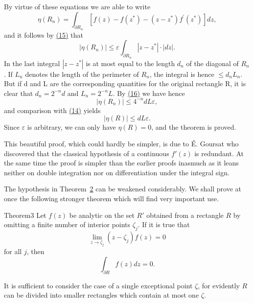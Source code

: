 By virtue of these equations we are able to write
\begin{equation*}
\eta (R _ {n}) = \int_ {\partial R _ {n}} [ f (z) - f (z ^ {*}) - (z - z ^ {*}) f ^ {\prime} (z ^ {*}) ] d z,
\end{equation*}
and it follows by \hyperref[eq:4.15]{(15)} that
\begin{equation*}
\left| \eta (R _ {n}) \right| \leq \varepsilon \int_ {\partial R _ {n}} | z - z ^ {*} | \cdot | d z |.\tag{16}\label{eq:4.16}
\end{equation*}
In the last integral $|z - z^{*}|$ is at most equal to the length $d_{n}$ of the diagonal of $R_{n}$. If $L_{n}$ denotes the length of the perimeter of $R_{n}$, the integral is hence $\leq d_{n}L_{n}$. But if d and L are the corresponding quantities for the original rectangle R, it is clear that $d_{n} = 2^{-n}d$ and $L_{n} = 2^{-n}L$. By \hyperref[eq:4.16]{(16)} we have hence
\begin{equation*}
\left| \eta (R _ {n}) \right| \leq 4 ^ {- n} d L \varepsilon ,
\end{equation*}
and comparison with \hyperref[eq:4.14]{(14)} yields
\begin{equation*}
| \eta (R) | \leq d L \varepsilon .
\end{equation*}
Since $\varepsilon$ is arbitrary, we can only have $\eta(R) = 0$, and the theorem is proved.

This beautiful proof, which could hardly be simpler, is due to É. Goursat who discovered that the classical hypothesis of a continuous $f'(z)$ is redundant. At the same time the proof is simpler than the earlier proofs inasmuch as it leans neither on double integration nor on differentiation under the integral sign.

The hypothesis in Theorem~\hyperref[thm:4.2]{2} can be weakened considerably. We shall prove at once the following stronger theorem which will find very important use.

\begin{originalstatement}{Theorem}{3}\label{thm:4.3}
Let $f(z)$ be analytic on the set $R'$ obtained from a rectangle $R$ by omitting a finite number of interior points $\zeta_j$. If it is true that
\begin{equation*}
\lim _ {z \rightarrow \zeta_ {j}} (z - \zeta_ {j}) f (z) = 0
\end{equation*}
for all $j$, then
\begin{equation*}
\int_ {\partial R} f (z) d z = 0.
\end{equation*}
\end{originalstatement}
It is sufficient to consider the case of a single exceptional point $\zeta$, for evidently $R$ can be divided into smaller rectangles which contain at most one $\zeta$.

